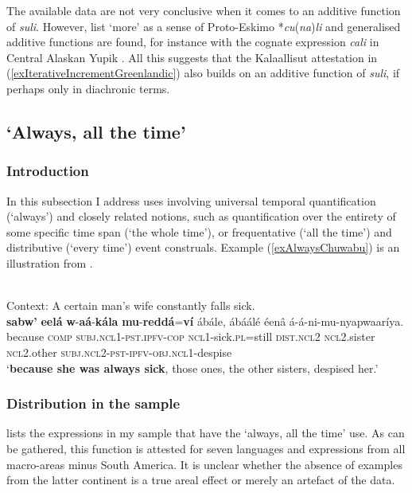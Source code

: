 The available data are not very conclusive when it comes to an additive function of \textit{suli}. However, \textcite[90]{FortescueEtAl1984} list \lq more' as a sense of Proto-Eskimo \mbox{*\textit{cu}(\textit{na})\textit{li}} and generalised additive functions are found, for instance with the cognate expression \textit{cali} in Central Alaskan Yupik \parencite{Miyaoka2012}. All this suggests that the Kalaallisut attestation in (\ref{exIterativeIncrementGreenlandic}) also builds on an additive function of \textit{suli}, if perhaps only in diachronic terms.


\subsection{\lq{}Always, all the time\rq}\label{sectionAlways}
\subsubsection{Introduction}In this subsection I address uses involving universal temporal quantification (\lq always') and closely related notions, such as quantification over the entirety of some specific time span (\lq the whole time'), or frequentative (\lq all the time') and distributive 
(\lq every time\rq{}) event construals. Example (\ref{exAlwaysChuwabu}) is an illustration from . 
\begin{exe}
	\ex {}\label{exAlwaysChuwabu}\\
	Context: A certain man’s wife constantly falls sick.\\
	\gll 	\textbf{sabw’} \textbf{eelá} \textbf{w}-\textbf{aá}-\textbf{kála} \textbf{mu}-\textbf{reddá}=\textbf{ví} ábále, ábáálé éenâ á-á-ni-mu-nyapwaaríya.\\
	because \textsc{comp} \textsc{subj}.\textsc{ncl}1-\textsc{pst}.\textsc{ipfv}-\textsc{cop} \textsc{ncl}1-sick.\textsc{pl}=still \textsc{dist}.\textsc{ncl}2 \textsc{ncl}2.sister \textsc{ncl}2.other \textsc{subj}.\textsc{ncl}2-\textsc{pst}-\textsc{ipfv}-\textsc{obj}.\textsc{ncl}1-despise\\
	\glt \lq \textbf{because she was always sick}, those ones, the other sisters, despised her.' \parencite[608]{Guerois2015}
\end{exe}

\subsubsection{Distribution in the sample}\largerpage
{} lists the expressions in my sample that have the \lq always, all the time\rq{ }use. As can be gathered, this function is attested for seven languages and expressions from all macro-areas minus South America. It is unclear whether the absence of examples from the latter continent is a true areal effect or merely an artefact of the data.

